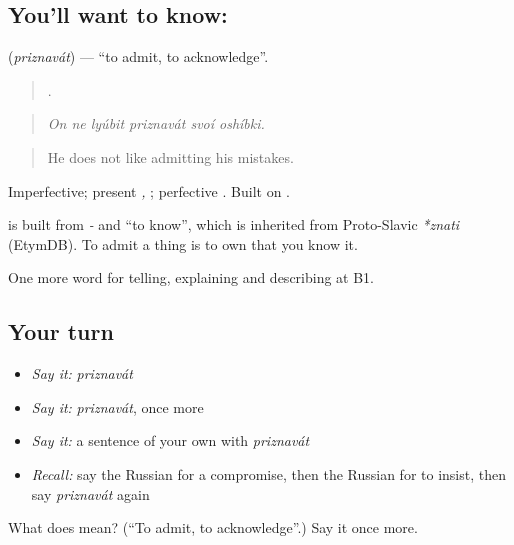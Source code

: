 \subsection*{You'll want to know: }
\textbf{} (\emph{priznavát}) — \textquotedblleft{}to admit, to acknowledge\textquotedblright{}.

\begin{quote}
     .
\end{quote}

\begin{quote}
\emph{On ne lyúbit priznavát svoí oshíbki.}
\end{quote}

\begin{quote}
He does not like admitting his mistakes.
\end{quote}

Imperfective; present \emph{, }; perfective \emph{}. Built on \emph{}.

\begin{cousinweb}
\textbf{} is built from \emph{-} and \emph{} \textquotedblleft{}to know\textquotedblright{}, which is inherited from Proto-Slavic \emph{*znati} (EtymDB). To admit a thing is to own that you know it.
\end{cousinweb}

\begin{grammarlens}[title={What you've built}]
One more word for telling, explaining and describing at B1.
\end{grammarlens}

\subsection*{Your turn}
\begin{itemize}
\raggedright
  \item \emph{Say it:} \emph{priznavát}
  \item \emph{Say it:} \emph{priznavát}, once more
  \item \emph{Say it:} a sentence of your own with \emph{priznavát}
  \item \emph{Recall:} say the Russian for a compromise, then the Russian for to insist, then say \emph{priznavát} again
\end{itemize}

\begin{tcolorbox}[breakable,colback=teal!4,colframe=teal!35!black,title={Before you move on}]
What does  mean? (\textquotedblleft{}To admit, to acknowledge\textquotedblright{}.) Say it once more.
\end{tcolorbox}
